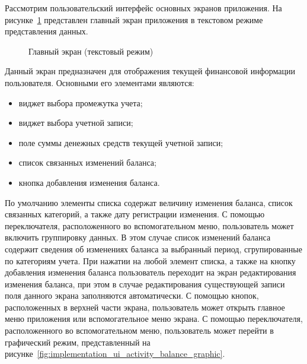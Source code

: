 Рассмотрим пользовательский интерфейс основных экранов приложения.
На рисунке~\ref{fig:implementation_ui_activity_balance_text}
представлен главный экран приложения в
текстовом режиме представления данных.

\begin{figure}[h!]
  \centering
  \caption{Главный экран (текстовый режим)}
  \label{fig:implementation_ui_activity_balance_text}
\end{figure}

Данный экран предназначен для отображения текущей финансовой
информации пользователя. Основными его элементами являются:
\begin{itemize}
\item виджет выбора промежутка учета;
\item виджет выбора учетной записи;
\item поле суммы денежных средств текущей учетной записи;
\item список связанных изменений баланса;
\item кнопка добавления изменения баланса.
\end{itemize}

По умолчанию элементы списка содержат величину изменения баланса,
список связанных категорий, а также дату регистрации изменения.
С помощью переключателя, расположенного во вспомогательном меню,
пользователь может включить группировку данных.
В этом случае список изменений баланса содержит сведения
об изменениях баланса за выбранный период,
сгрупированные по категориям учета.
При нажатии на любой элемент списка,
а также на кнопку добавления изменения баланса пользователь переходит
на экран редактирования изменения баланса,
при этом в случае редактирования существующей записи поля данного
экрана заполняются автоматически.
С помощью кнопок, расположенных в верхней части экрана, пользователь
может открыть главное меню приложения или вспомогательное меню экрана.
С помощью переключателя, расположенного во вспомогательном меню,
пользователь может перейти в графический режим, представленный
на рисунке~\ref{fig:implementation_ui_activity_balance_graphic}.

